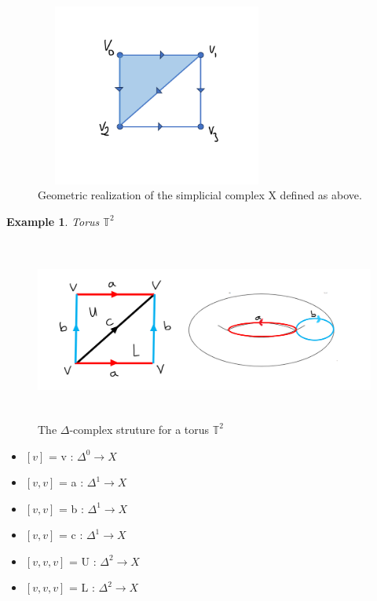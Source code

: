 \documentclass{article}
\newtheorem{example}[theorem]{Example}
\begin{document}
\begin{figure}[h!]
    \centering
    \includegraphics[width = 8cm, height = 6cm]{SimplicialComplexexample1.png}
    \caption{Geometric realization of the simplicial complex X defined as above.}
    \label{SCExample 1}
\end{figure}
\begin{example} Torus $\mathbb{T}^2$
\end{example}
\begin{figure}[h!]
    \includegraphics[width = 16cm, height = 6cm]{Complex structure torus.png}
    \caption{The $\Delta$-complex struture for a torus $\mathbb{T}^2$}
    \label{fig:delta-complex structure torus}
\end{figure}

\begin{itemize}
    \item $[v]$ = v : $\Delta^0 \rightarrow X$
    \item $[v,v]$ = a : $\Delta^1 \rightarrow X$
    \item $[v,v]$ = b : $\Delta^1 \rightarrow X$
    \item $[v,v]$ = c : $\Delta^1 \rightarrow X$
    \item $[v,v,v]$ = U : $\Delta^2 \rightarrow X$
    \item $[v,v,v]$ = L : $\Delta^2 \rightarrow X$
\end{itemize}
\end{document}
